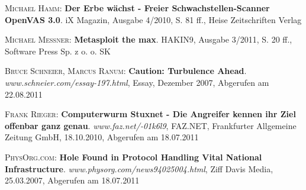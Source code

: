 \begin{thebibliography}{---}
  \textsc{Michael Hamm}: 
  \textbf{Der Erbe wächst - Freier Schwachstellen-Scanner OpenVAS 3.0}.
  iX Magazin, Ausgabe 4/2010, S. 81 ff., Heise Zeitschriften Verlag

  \textsc{Michael Messner}: 
  \textbf{Metasploit the max}.
  HAKIN9, Ausgabe 3/2011, S. 20 ff., Software Press Sp. z o. o. SK

  \textsc{Bruce Schneier, Marcus Ranum}: 
  \textbf{Caution: Turbulence Ahead}.
  \emph{www.schneier.com/essay-197.html},
  Essay, Dezember 2007, Abgerufen am 22.08.2011

  \textsc{Frank Rieger}: 
  \textbf{Computerwurm Stuxnet - Die Angreifer kennen ihr Ziel offenbar ganz genau}.
  \emph{www.faz.net/-01k6l9},
  FAZ.NET,  Frankfurter Allgemeine Zeitung GmbH, 18.10.2010, Abgerufen am 18.07.2011

  \textsc{PhysOrg.com}: 
  \textbf{Hole Found in Protocol Handling Vital National Infrastructure}.
  \emph{www.physorg.com/news94025004.html},
  Ziff Davis Media, 25.03.2007, Abgerufen am 18.07.2011
\end{thebibliography}

